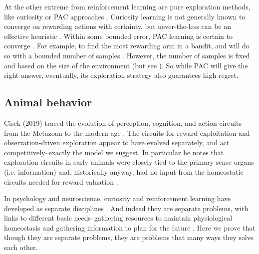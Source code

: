 
At the other extreme from reinforcement learning are pure exploration methods, like curiosity \cite{Berlyne1950,Jaegle2019,Pathak2017} or PAC approaches \cite{Valiant1984}. Curiosity learning is not generally known to converge on rewarding actions with certainty, but never-the-less can be an effective heuristic \cite{Pathak2017,Burda2018,Colas2019}. Within some bounded error, PAC learning is certain to converge \cite{Valiant1984}. For example, to find the most rewarding arm in a bandit, and will do so with a bounded number of samples \cite{Even-Dar2002}. However, the number of samples is fixed and based on the size of the environment (but see \cite{Even-Dar2006,Strehl2009}). So while PAC will give the right answer, eventually, its exploration strategy also guarantees high regret.

\subsection*{Animal behavior}
Cisek (2019) traced the evolution of perception, cognition, and action circuits from the Metazoan to the modern age \cite{Cisek2019}. The circuits for reward exploitation and observation-driven exploration appear to have evolved separately, and act competitively--exactly the model we suggest. In particular he notes that exploration circuits in early animals were closely tied to the primary sense organs (i.e. information) and, historically anyway, had no input from the homeostatic circuits needed for reward valuation \cite{Keramati2014,Cisek2019,Juechems2019}. 

In psychology and neuroscience, curiosity and reinforcement learning have developed as separate disciplines \cite{Berlyne1950,Kidd2015,Sutton2018}. And indeed they are separate problems, with links to different basic needs--gathering resources to maintain physiological homeostasis \cite{Keramati2014,Juechems2019} and gathering information to plan for the future \cite{Valiant1984,Sutton2018}. Here we prove that though they are separate problems, they are problems that many ways they solve each other.

